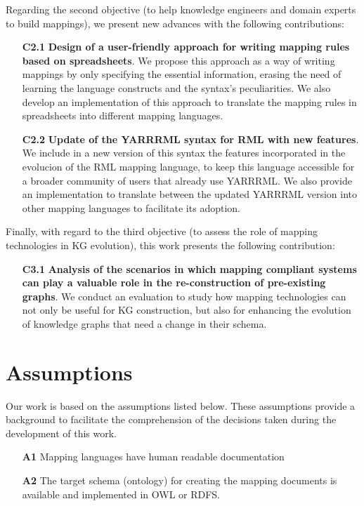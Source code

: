 Regarding the second objective (to help knowledge engineers and domain experts to build mappings), we present new advances with the following contributions:

\begin{enumerate}
    \item[\textbf{C2.1}] \textbf{Design of a user-friendly approach for writing mapping rules based on spreadsheets}. We propose this approach as a way of writing mappings by only specifying the essential information, erasing the need of learning the language constructs and the syntax's peculiarities. We also develop an implementation of this approach to translate the mapping rules in spreadsheets into different mapping languages. 
    \item[\textbf{C2.2}] \textbf{Update of the YARRRML syntax for RML with new features}. We include in a new version of this syntax the features incorporated in the evolucion of the RML mapping language, to keep this language accessible for a broader community of users that already use YARRRML. We also provide an implementation to translate between the updated YARRRML version into other mapping languages to facilitate its adoption.
\end{enumerate}

Finally, with regard to the third objective (to assess the role of mapping technologies in KG evolution), this work presents the following contribution:

\begin{enumerate}
    \item[\textbf{C3.1}]\textbf{ Analysis of the scenarios in which mapping compliant systems can play a valuable role in the re-construction of pre-existing graphs}. We conduct an evaluation to study how mapping technologies can not only be useful for KG construction, but also for enhancing the evolution of knowledge graphs that need a change in their schema. 
\end{enumerate}


\section{Assumptions}
\label{sec:chp3-assumptions}
Our work is based on the assumptions listed below. These assumptions provide a background to facilitate the comprehension of the decisions taken during the development of this work. 


\begin{enumerate}
    \item[\textbf{A1}] Mapping languages have human readable documentation
    \item[\textbf{A2}] The target schema (ontology) for creating the mapping documents is available and implemented in OWL or RDFS. 
\end{enumerate}


